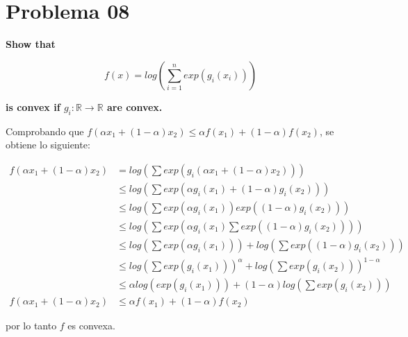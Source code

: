 \section*{Problema 08}

\textbf{Show that}

\begin{equation*}
    f(x) = log\left ( \sum_{i=1}^n exp(g_i(x_i)) \right )
\end{equation*}

\textbf{is convex if $g_i: \mathbb{R} \rightarrow \mathbb{R}$ are convex.}

Comprobando que $f(\alpha x_1 + (1-\alpha)x_2) \leq \alpha f(x_1) + (1-\alpha)f(x_2)$, se obtiene lo siguiente:

\begin{align*}
    f(\alpha x_1 + (1-\alpha)x_2) & = log \left ( \sum exp(g_i(\alpha x_1 + (1-\alpha)x_2)) \right )                                      \\
                                  & \leq log \left (\sum exp(\alpha g_i(x_1)+(1-\alpha)g_i(x_2))\right )                                  \\
                                  & \leq log \left (\sum exp(\alpha g_i(x_1))exp((1-\alpha)g_i(x_2))\right )                              \\
                                  & \leq log \left (\sum exp(\alpha g_i(x_1)\sum exp((1-\alpha)g_i(x_2)))\right )                         \\
                                  & \leq log \left (\sum exp(\alpha g_i(x_1))\right ) + log \left (\sum exp((1-\alpha)g_i(x_2))\right )   \\
                                  & \leq log \left (\sum exp(g_i(x_1)) \right )^\alpha + log \left (\sum exp(g_i(x_2))\right )^{1-\alpha} \\
                                  & \leq \alpha log \left (exp(g_i(x_1)) \right ) + (1-\alpha) log \left (\sum exp(g_i(x_2))\right )      \\
    f(\alpha x_1 + (1-\alpha)x_2) & \leq \alpha f(x_1) + (1-\alpha)f(x_2)
\end{align*}

por lo tanto $f$ es convexa.